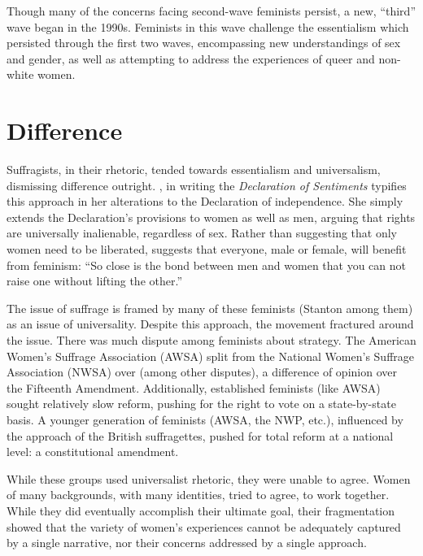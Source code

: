\documentclass[man,12pt,natbib]{apa6}
\begin{document}
Though many of the concerns facing second-wave feminists persist, a new,
``third'' wave began in the 1990s. Feminists in this wave challenge the
essentialism which persisted through the first two waves, encompassing new
understandings of sex and gender, as well as attempting to address the
experiences of queer and non-white women.

\section{Difference}

Suffragists, in their rhetoric, tended towards essentialism and universalism,
dismissing difference outright. \citet{Stanton48}, in writing the
\emph{Declaration of Sentiments} typifies this approach in her alterations to
the Declaration of independence. She simply extends the Declaration's
provisions to women as well as men, arguing that rights are universally
inalienable, regardless of sex.  Rather than suggesting that only women need to
be liberated, \citet{Harper95} suggests that everyone, male or female, will
benefit from feminism: ``So close is the bond between men and women that you
can not raise one without lifting the other.''

The issue of suffrage is framed by many of these feminists (Stanton among them)
as an issue of universality. Despite this approach, the movement fractured
around the issue. There was much dispute among feminists about strategy. The
American Women's Suffrage Association (AWSA) split from the National Women's
Suffrage Association (NWSA) over (among other disputes), a difference of
opinion over the Fifteenth Amendment. Additionally, established feminists (like
AWSA) sought relatively slow reform, pushing for the right to vote on a
state-by-state basis. A younger generation of feminists (AWSA, the NWP, etc.),
influenced by the approach of the British suffragettes, pushed for total reform
at a national level: a constitutional amendment.

While these groups used universalist rhetoric, they were unable to agree. Women
of many backgrounds, with many identities, tried to agree, to work together.
While they did eventually accomplish their ultimate goal, their fragmentation
showed that the variety of women's experiences cannot be adequately captured by 
a single narrative, nor their concerns addressed by a single approach.
\end{document}
